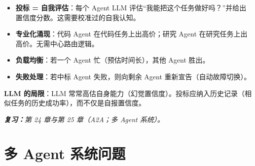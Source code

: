 \begin{questionbox}
\begin{itemize}
  \item \textbf{投标 = 自我评估}：每个 Agent LLM 评估“我能把这个任务做好吗？”并给出置信度分数。这需要校准过的自我认知。
  \item \textbf{专业化涌现}：代码 Agent 在代码任务上出高价；研究 Agent 在研究任务上出高价。无需中心路由逻辑。
  \item \textbf{负载均衡}：若一个 Agent 忙（预估时间长），其他 Agent 胜出。
  \item \textbf{失败处理}：若中标 Agent 失败，则向剩余 Agent 重新宣告（自动故障切换）。
\end{itemize}

\textbf{LLM 的局限}：LLM 常常高估自身能力（幻觉置信度）。投标应纳入历史记录（相似任务的历史成功率），而不仅是自报置信度。

\emph{\textbf{复习：}第 24 章与第 25 章（A2A；多 Agent 系统）。}
\end{questionbox}

\section{多 Agent 系统问题}
\label{multi-agent-systems-questions}

